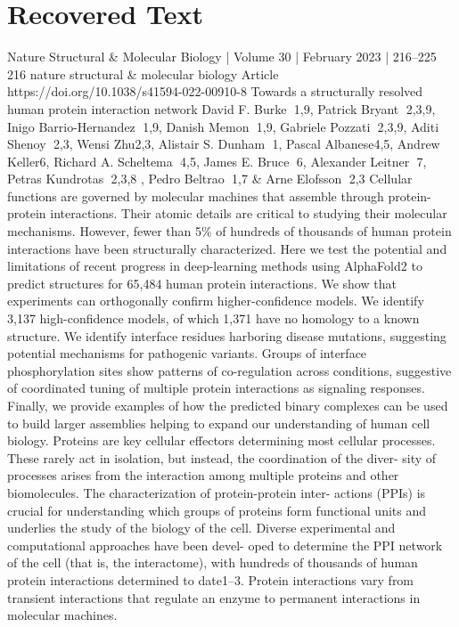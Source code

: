 \section{Recovered Text}
Nature Structural \& Molecular Biology | Volume 30 | February 2023 | 216–225
216
nature structural \& molecular biology
Article
https://doi.org/10.1038/s41594-022-00910-8
Towards a structurally resolved human
protein interaction network
David F. Burke
  1,9, Patrick Bryant
  2,3,9, Inigo Barrio-Hernandez
  1,9,
Danish Memon
  1,9, Gabriele Pozzati
  2,3,9, Aditi Shenoy
  2,3, Wensi Zhu2,3,
Alistair S. Dunham
  1, Pascal Albanese4,5, Andrew Keller6,
Richard A. Scheltema
  4,5, James E. Bruce
  6, Alexander Leitner
  7,
Petras Kundrotas
  2,3,8
, Pedro Beltrao
  1,7
 \& Arne Elofsson
  2,3
Cellular functions are governed by molecular machines that assemble
through protein-protein interactions. Their atomic details are critical to
studying their molecular mechanisms. However, fewer than 5\% of hundreds
of thousands of human protein interactions have been structurally
characterized. Here we test the potential and limitations of recent progress
in deep-learning methods using AlphaFold2 to predict structures for 65,484
human protein interactions. We show that experiments can orthogonally
confirm higher-confidence models. We identify 3,137 high-confidence
models, of which 1,371 have no homology to a known structure. We identify
interface residues harboring disease mutations, suggesting potential
mechanisms for pathogenic variants. Groups of interface phosphorylation
sites show patterns of co-regulation across conditions, suggestive of
coordinated tuning of multiple protein interactions as signaling responses.
Finally, we provide examples of how the predicted binary complexes can
be used to build larger assemblies helping to expand our understanding of
human cell biology.
Proteins are key cellular effectors determining most cellular processes.
These rarely act in isolation, but instead, the coordination of the diver-
sity of processes arises from the interaction among multiple proteins
and other biomolecules. The characterization of protein-protein inter-
actions (PPIs) is crucial for understanding which groups of proteins
form functional units and underlies the study of the biology of the cell.
Diverse experimental and computational approaches have been devel-
oped to determine the PPI network of the cell (that is, the interactome),
with hundreds of thousands of human protein interactions determined
to date1–3. Protein interactions vary from transient interactions that
regulate an enzyme to permanent interactions in molecular machines.
